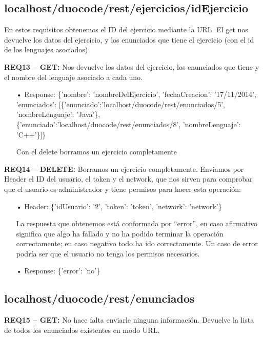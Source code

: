 \subsection{localhost/duocode/rest/ejercicios/idEjercicio}
En estos requisitos obtenemos el ID del ejercicio mediante la URL.
El get nos devuelve los datos del ejercicio, y los enunciados que tiene el ejercicio (con el id de los lenguajes asociados)
\vspace{1em}

\textbf{REQ13 – GET:} Nos devuelve los datos del ejercicio, los enunciados que tiene y el nombre del lenguaje asociado a cada uno.

\begin{itemize}
\item[•]
Response: \{'nombre': 'nombreDelEjercicio', 'fechaCreacion': '17/11/2014', 'enunciados': [\{'enunciado':'localhost/duocode/rest/enunciados/5', 'nombreLenguaje': 'Java'\}, \{'enunciado':'localhost/duocode/rest/enunciados/8', 'nombreLenguaje': 'C++'\}]\}

\vspace{1em}
Con el delete borramos un ejercicio completamente
\end{itemize}

\textbf{REQ14 – DELETE:} Borramos un ejercicio completamente. Enviamos por Header el ID del usuario, el token y el network, que nos sirven para comprobar que el usuario es administrador y tiene permisos para hacer esta operación:

\begin{itemize}
\item[•]
Header: 
\{'idUsuario': '2', 'token': 'token', 'network': 'network'\}
\vspace{1em}

La respuesta que obtenemos está conformada por “error”, en caso afirmativo significa que algo ha fallado y no ha podido terminar la operación correctamente; en caso negativo todo ha ido correctamente. Un caso de error podría ser que el usuario no tenga los permisos necesarios.
\item[•]
Response: 
\{'error': 'no'\}
\end{itemize}

\subsection{localhost/duocode/rest/enunciados}
\textbf{REQ15 – GET:} No hace falta enviarle ninguna información. Devuelve la lista de todos los enunciados existentes en modo URL. 


